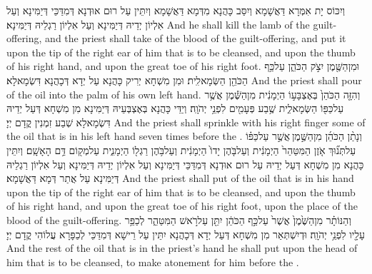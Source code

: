 {וְיִכּוֹס יָת אִמְּרָא דַּאֲשָׁמָא וְיִסַּב כָּהֲנָא מִדְּמָא דַּאֲשָׁמָא וְיִתֵּין עַל רוּם אוּדְנָא דְּמִדַּכֵּי דְּיַמִּינָא וְעַל אִלְיוֹן יְדֵיהּ דְּיַמִּינָא וְעַל אִלְיוֹן רַגְלֵיהּ דְּיַמִּינָא׃}
{And he shall kill the lamb of the guilt-offering, and the priest shall take of the blood of the guilt-offering, and put it upon the tip of the right ear of him that is to be cleansed, and upon the thumb of his right hand, and upon the great toe of his right foot.}{}
{וּמִן\maqqaf הַשֶּׁ֖מֶן יִצֹ֣ק הַכֹּהֵ֑ן עַל\maqqaf כַּ֥ף הַכֹּהֵ֖ן הַשְּׂמָאלִֽית׃}
{וּמִן מִשְׁחָא יְרִיק כָּהֲנָא עַל יְדָא דְּכָהֲנָא דִּשְׂמָאלָא׃}
{And the priest shall pour of the oil into the palm of his own left hand.}{}
{וְהִזָּ֤ה הַכֹּהֵן֙ בְּאֶצְבָּע֣וֹ הַיְמָנִ֔ית מִן\maqqaf הַשֶּׁ֕מֶן אֲשֶׁ֥ר עַל\maqqaf כַּפּ֖וֹ הַשְּׂמָאלִ֑ית שֶׁ֥בַע פְּעָמִ֖ים לִפְנֵ֥י יְהֹוָֽה׃}
{וְיַדֵּי כָּהֲנָא בְּאֶצְבְּעֵיהּ דְּיַמִּינָא מִן מִשְׁחָא דְּעַל יְדֵיהּ דִּשְׂמָאלָא שְׁבַע זִמְנִין קֳדָם יְיָ׃}
{And the priest shall sprinkle with his right finger some of the oil that is in his left hand seven times before the \lord.}{}
{וְנָתַ֨ן הַכֹּהֵ֜ן מִן\maqqaf הַשֶּׁ֣מֶן \legarmeh  אֲשֶׁ֣ר עַל\maqqaf כַּפּ֗וֹ עַל\maqqaf תְּנ֞וּךְ אֹ֤זֶן הַמִּטַּהֵר֙ הַיְמָנִ֔ית וְעַל\maqqaf בֹּ֤הֶן יָדוֹ֙ הַיְמָנִ֔ית וְעַל\maqqaf בֹּ֥הֶן רַגְל֖וֹ הַיְמָנִ֑ית עַל\maqqaf מְק֖וֹם דַּ֥ם הָאָשָֽׁם׃}
{וְיִתֵּין כָּהֲנָא מִן מִשְׁחָא דְּעַל יְדֵיהּ עַל רוּם אוּדְנָא דְּמִדַּכֵּי דְּיַמִּינָא וְעַל אִלְיוֹן יְדֵיהּ דְּיַמִּינָא וְעַל אִלְיוֹן רַגְלֵיהּ דְּיַמִּינָא עַל אֲתַר דְּמָא דַּאֲשָׁמָא׃}
{And the priest shall put of the oil that is in his hand upon the tip of the right ear of him that is to be cleansed, and upon the thumb of his right hand, and upon the great toe of his right foot, upon the place of the blood of the guilt-offering.}{}
{וְהַנּוֹתָ֗ר מִן\maqqaf הַשֶּׁ֙מֶן֙ אֲשֶׁר֙ עַל\maqqaf כַּ֣ף הַכֹּהֵ֔ן יִתֵּ֖ן עַל\maqqaf רֹ֣אשׁ הַמִּטַּהֵ֑ר לְכַפֵּ֥ר עָלָ֖יו לִפְנֵ֥י יְהֹוָֽה׃}
{וּדְיִשְׁתְּאַר מִן מִשְׁחָא דְּעַל יְדָא דְּכָהֲנָא יִתֵּין עַל רֵישָׁא דְּמִדַּכֵּי לְכַפָּרָא עֲלוֹהִי קֳדָם יְיָ׃}
{And the rest of the oil that is in the priest’s hand he shall put upon the head of him that is to be cleansed, to make atonement for him before the \lord.}{}
